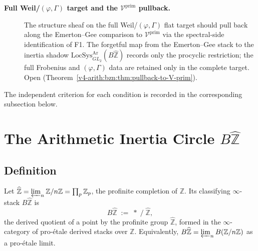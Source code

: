 \begin{description}
\item[\textbf{Full Weil/\((\varphi,\Gamma)\) target and the
\(\mathcal{V}^{\mathrm{prim}}\) pullback.}]
The structure sheaf on the full Weil/\((\varphi,\Gamma)\) flat target
should pull back along the Emerton--Gee comparison to
\(\mathcal{V}^{\mathrm{prim}}\) via the spectral-side identification
of F1. The forgetful map from the Emerton--Gee stack to the inertia
shadow \(\mathrm{LocSys}^{\mathrm{Ar}}_{GL_{2}}(B\widehat{\mathbb{Z}})\)
records only the procyclic restriction; the full Frobenius and
\((\varphi,\Gamma)\) data are retained only in the complete target.
Open
(Theorem~\ref{v4-arith:bzn:thm:pullback-to-V-prim}).
\end{description}

The independent criterion for each condition is recorded in the
corresponding subsection below.

\section{The Arithmetic Inertia Circle \(B\widehat{\mathbb{Z}}\)}
\label{v4-arith:bzn:inertia-circle}

\subsection{Definition}

\begin{definition}
\label{v4-arith:bzn:def:B-Z-hat}
Let \(\widehat{\mathbb{Z}}=\varprojlim_{n}\mathbb{Z}/n\mathbb{Z}=\prod_{p}\mathbb{Z}_{p}\),
the profinite completion of \(\mathbb{Z}\). Its classifying
\(\infty\)-stack \(B\widehat{\mathbb{Z}}\) is
\begin{equation}
B\widehat{\mathbb{Z}}\;:=\;*\;/\;\widehat{\mathbb{Z}},
\end{equation}
the derived quotient of a point by the profinite group
\(\widehat{\mathbb{Z}}\), formed in the \(\infty\)-category of
pro-\'etale derived stacks over \(\mathbb{Z}\). Equivalently,
\(B\widehat{\mathbb{Z}}=\varprojlim_{n}B(\mathbb{Z}/n\mathbb{Z})\)
as a pro-\'etale limit.
\end{definition}


